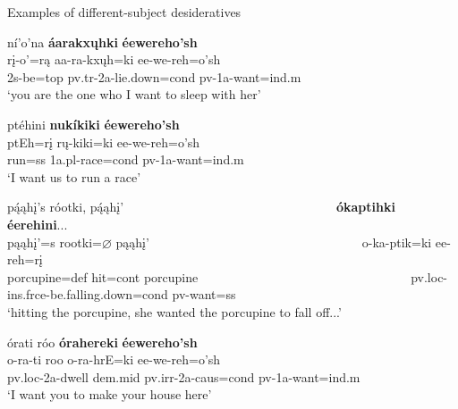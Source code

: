 \begin{exe}
    \item\label{Ch5DesidDS} Examples of different-subject desideratives

    \begin{xlist}
        \item\label{Ch5DesidDSA} \glll ní'o'na \textbf{áarakxųhki} \textbf{éewereho'sh}\\
        rį-o'=rą aa-ra-kxųh=ki ee-we-reh=o'sh\\
        2s-\textnormal{be}=top pv.tr-2a-\textnormal{lie.down}=cond pv-1a-\textnormal{want}=ind.m\\
        \glt `you are the one who I want to sleep with her' \citep[75]{trechter2012b}

        \item\label{Ch5DesidDSB} \glll ptéhini \textbf{nukíkiki} \textbf{éewereho'sh}\\
        ptEh=rį rų-kiki=ki ee-we-reh=o'sh\\
        \textnormal{run}=ss 1a.pl-\textnormal{race}=cond pv-1a-\textnormal{want}=ind.m\\
        \glt `I want us to run a race' \citep[39]{hollow1973a}

        \item\label{Ch5DesidDSC} \glll pą́ąhį's róotki, pą́ąhį' ~ ~ ~ ~ ~ ~ ~ ~ ~ ~ ~ ~ ~ ~ ~ ~ ~ ~ ~ ~ \textbf{ókaptihki} \textbf{éerehini}...\\
        pąąhį'=s rootki=$\varnothing$ pąąhį' ~ ~ ~ ~ ~ ~ ~ ~ ~ ~ ~ ~ ~ ~ ~ ~ ~ ~ ~ ~ o-ka-ptik=ki ee-reh=rį\\
        \textnormal{porcupine}=def \textnormal{hit}=cont \textnormal{porcupine} ~ ~ ~ ~ ~ ~ ~ ~ ~ ~ ~ ~ ~ ~ ~ ~ ~ ~ ~ ~ pv.loc-ins.frce-\textnormal{be.falling.down}=cond pv-\textnormal{want}=ss\\
        \glt `hitting the porcupine, she wanted the porcupine to fall off...' \citep[65]{hollow1973a}

        \item\label{Ch5DesidDSD} \glll órati róo \textbf{órahereki} \textbf{éewereho'sh}\\
        o-ra-ti roo o-ra-hrE=ki ee-we-reh=o'sh\\
        pv.loc-2a-\textnormal{dwell} dem.mid pv.irr-2a-caus=cond pv-1a-\textnormal{want}=ind.m\\
        \glt `I want you to make your house here' \citep[299]{hollow1973b}
        
    \end{xlist}
\end{exe}

